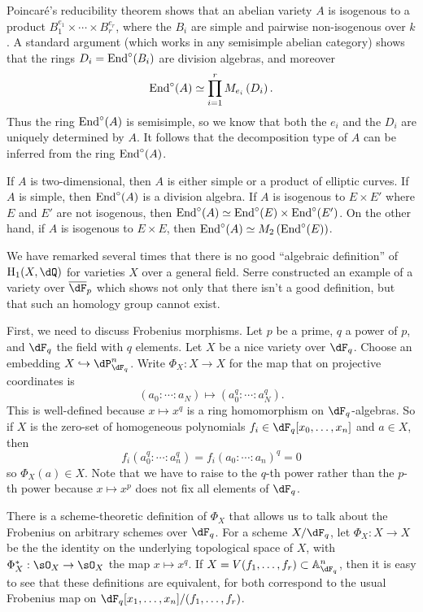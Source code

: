 Poincar\'e's reducibility theorem shows that an abelian variety $A$ is 
isogenous to a product $B_1^{e_1}\times \cdots \times B_r^{e_r}$, where the 
$B_i$ are simple and pairwise non-isogenous over $k$. A standard argument 
(which works in any semisimple abelian category) shows that the rings 
$D_i=\operatorname{End}^\circ(B_i)$ are division algebras, and moreover 
\[
  \operatorname{End}^\circ(A) \simeq \prod_{i=1}^r M_{e_i}\left(D_i\right) \text{.}
\]
Thus the ring $\operatorname{End}^\circ(A)$ is semisimple, so we know that both the $e_i$ and 
the $D_i$ are uniquely determined by $A$. It follows that the decomposition 
type of $A$ can be inferred from the ring $\operatorname{End}^\circ(A)$. 

\begin{example}
If $A$ is two-dimensional, then $A$ is either simple or a product of elliptic 
curves. If $A$ is simple, then $\operatorname{End}^\circ(A)$ is a division algebra. If $A$ 
is isogenous to $E\times E'$ where $E$ and $E'$ are not isogenous, then 
$\operatorname{End}^\circ(A)\simeq \operatorname{End}^\circ(E)\times \operatorname{End}^\circ(E')$. On the other hand, if 
$A$ is isogenous to $E\times E$, then 
$\operatorname{End}^\circ(A)\simeq M_2\left(\operatorname{End}^\circ(E)\right)$. 
\end{example}

We have remarked several times that there is no good ``algebraic definition'' 
of $\h_1(X,\dQ)$ for varieties $X$ over a general field. Serre constructed an 
example of a variety over $\overline\dF_p$ which shows not only that there 
isn't a good definition, but that such an homology group cannot exist. 

First, we need to discuss Frobenius morphisms. Let $p$ be a prime, $q$ a power 
of $p$, and $\dF_q$ the field with $q$ elements. Let $X$ be a nice variety over 
$\dF_q$. Choose an embedding $X\hookrightarrow \dP_{\dF_q}^n$. Write 
$\Phi_X:X\to X$ for the map that on projective coordinates is 
\[
  (a_0:\cdots:a_N) \mapsto (a_0^q:\cdots :a_N^q) \text{.}
\]
This is well-defined because $x\mapsto x^q$ is a ring homomorphism on 
$\dF_q$-algebras. So if $X$ is the zero-set of homogeneous polynomials 
$f_i\in \dF_q[x_0,\dots,x_n]$ and $a\in X$, then 
\[
  f_i(a_0^q:\cdots:a_n^q) = f_i(a_0:\cdots:a_n)^q = 0
\]
so $\Phi_X(a)\in X$. Note that we have to raise to the $q$-th power rather 
than the $p$-th power because $x\mapsto x^p$ does not fix all elements of 
$\dF_q$. 

There is a scheme-theoretic definition of $\Phi_X$ that allows us to talk about 
the Frobenius on arbitrary schemes over $\dF_q$. For a scheme $X/\dF_q$, let 
$\Phi_X:X\to X$ be the the identity on the underlying topological space of $X$, 
with $\Phi_X^\ast:\sO_X\to \sO_X$ the map $x\mapsto x^q$. If 
$X=V(f_1,\dots,f_r)\subset \mathbb{A}_{\dF_q}^n$, then it is easy to see that 
these definitions are equivalent, for both correspond to the usual Frobenius 
map on $\dF_q[x_1,\dots,x_n]/(f_1,\dots,f_r)$. 

